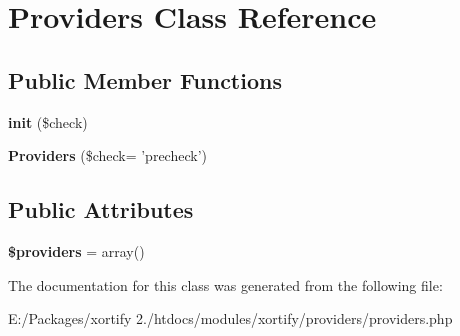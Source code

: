 \hypertarget{class_providers}{\section{Providers Class Reference}
\label{class_providers}
}
\subsection*{Public Member Functions}
\begin{DoxyCompactItemize}
\item 
\hypertarget{class_providers_a332ffc04d7fe2bba92018db52ea3e4cc}{{\bfseries init} (\$check)}\label{class_providers_a332ffc04d7fe2bba92018db52ea3e4cc}

\item 
\hypertarget{class_providers_a8a840c8856e12e80f7487e465234aa2b}{{\bfseries Providers} (\$check= 'precheck')}\label{class_providers_a8a840c8856e12e80f7487e465234aa2b}

\end{DoxyCompactItemize}
\subsection*{Public Attributes}
\begin{DoxyCompactItemize}
\item 
\hypertarget{class_providers_a09429a1021cfcba50615375076aef4bc}{{\bfseries \$providers} = array()}\label{class_providers_a09429a1021cfcba50615375076aef4bc}

\end{DoxyCompactItemize}


The documentation for this class was generated from the following file\-:\begin{DoxyCompactItemize}
\item 
E\-:/\-Packages/xortify 2./htdocs/modules/xortify/providers/providers.\-php\end{DoxyCompactItemize}
